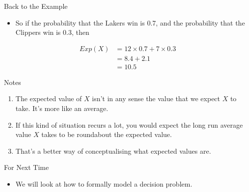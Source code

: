 \documentclass[
  ignorenonframetext,
]{beamer}
\providecommand{\tightlist}{%
  \setlength{\itemsep}{0pt}\setlength{\parskip}{0pt}}
\renewcommand{\,}{\text{, }}
\begin{document}
\begin{frame}{Back to the Example}
\protect\hypertarget{back-to-the-example}{}
\begin{itemize}
\tightlist
\item
  So if the probability that the Lakers win is 0.7, and the probability
  that the Clippers win is 0.3, then
\end{itemize}

\begin{align*}
Exp(X) &= 12 \times 0.7 + 7 \times 0.3 \\
 &= 8.4 + 2.1 \\
 &= 10.5
\end{align*}
\end{frame}

\begin{frame}{Notes}
\protect\hypertarget{notes}{}
\begin{enumerate}
\tightlist
\item
  The expected value of \(X\) isn't in any sense the value that we
  expect \(X\) to take. It's more like an average.
\item
  If this kind of situation recurs a lot, you would expect the long run
  average value \(X\) takes to be roundabout the expected value.
\item
  That's a better way of conceptualising what expected values are.
\end{enumerate}
\end{frame}

\begin{frame}{For Next Time}
\protect\hypertarget{for-next-time}{}
\begin{itemize}
\tightlist
\item
  We will look at how to formally model a decision problem.
\end{itemize}
\end{frame}
\end{document}
